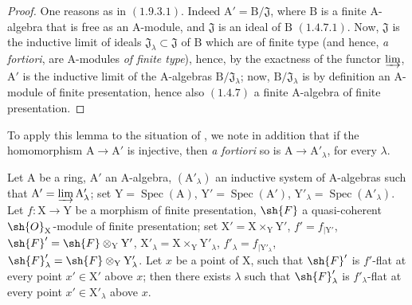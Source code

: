 \begin{proof}
One reasons as in $(1.9.3.1)$. Indeed $\mathrm{A}'=\mathrm{B}/\mathfrak{J}$, where $\mathrm{B}$ is a finite $\mathrm{A}$-algebra
that is free as an $\mathrm{A}$-module, and $\mathfrak{J}$ is an ideal of $\mathrm{B}$ $(1.4.7.1)$. Now, $\mathfrak{J}$ is the inductive
limit of ideals $\mathfrak{J}_\lambda\subset\mathfrak{J}$ of $\mathrm{B}$ which are of finite type (and hence, \emph{a fortiori}, are $\mathrm{A}$-modules \emph{of finite type}),
hence,
by the exactness of the functor $\varinjlim$, $\mathrm{A}'$ is the inductive limit of the $\mathrm{A}$-algebras $\mathrm{B}/\mathfrak{J}_\lambda$; now, $\mathrm{B}/\mathfrak{J}_\lambda$
is by definition an $\mathrm{A}$-module of finite presentation, hence also $(1.4.7)$ a finite $\mathrm{A}$-algebra
of finite presentation.
\end{proof}


To apply this lemma to the situation of , we note in addition
that if the homomorphism $\mathrm{A}\to\mathrm{A}'$ is injective, then
\emph{a fortiori} so is $\mathrm{A}\to\mathrm{A}'_\lambda$, for every
$\lambda$.

\begin{lemma}[11.5.5.2]
\label{IV.11.5.5.2}
Let $\mathrm{A}$ be a ring, $\mathrm{A}'$ an $\mathrm{A}$-algebra, $(\mathrm{A}'_\lambda)$ an inductive system
of $\mathrm{A}$-algebras such that $\mathrm{A}'=\varinjlim\mathrm{A}'_\lambda$; set $\mathrm{Y}=\operatorname{Spec}(\mathrm{A})$, $\mathrm{Y}'=\operatorname{Spec}(\mathrm{A}')$, $\mathrm{Y}'_\lambda=\operatorname{Spec}(\mathrm{A}'_\lambda)$.
Let $f:\mathrm{X}\to\mathrm{Y}$ be a morphism of finite presentation, $\sh{F}$ a quasi-coherent $\sh{O}_\mathrm{X}$-module of finite
presentation; set $\mathrm{X}'=\mathrm{X}\times_\mathrm{Y}\mathrm{Y}'$, $f'=f_{|\mathrm{Y}'}$, $\sh{F}'=\sh{F}\otimes_\mathrm{Y}\mathrm{Y}'$, $\mathrm{X}'_\lambda=\mathrm{X}\times_\mathrm{Y}\mathrm{Y}'_\lambda$, $f'_\lambda=f_{|\mathrm{Y}'_\lambda}$,
$\sh{F}'_\lambda=\sh{F}\otimes_\mathrm{Y}\mathrm{Y}'_\lambda$. Let $x$ be a point of $\mathrm{X}$, such that $\sh{F}'$ is $f'$-flat at every point $x'\in\mathrm{X}'$ above $x$;
then there exists $\lambda$ such that $\sh{F}'_\lambda$ is $f'_\lambda$-flat at every point $x'\in\mathrm{X}'_\lambda$ above $x$.
\end{lemma}


